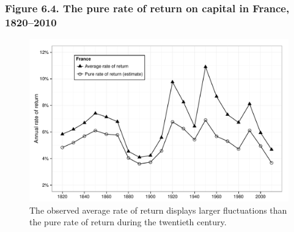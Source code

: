 \documentclass[t]{beamer}\usepackage[]{graphicx}\usepackage[]{color}
\newenvironment{knitrout}{}{} %
\begin{document}
\begin{frame}[label=Figure_6_4]
\frametitle{Figure 6.4. The pure rate of return on capital in France, 1820--2010}
\begin{figure}[t]
\begin{minipage}[b]{\textwidth}
\centering
\begin{knitrout}\footnotesize
{}\color{fgcolor}

{\centering \includegraphics[width=1\linewidth]{figures/bw/Figure_6_4} 

}



\end{knitrout}
\caption{The observed average rate of return displays larger fluctuations than the pure rate of return during the twentieth century.}
\end{minipage}
\end{figure}
\end{frame}
\end{document}
